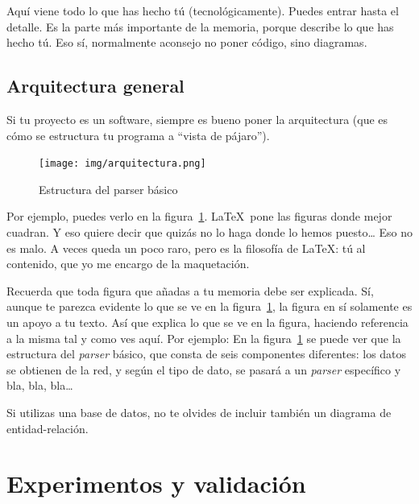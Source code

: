 \documentclass[a4paper, 12pt]{book}
\begin{document}
	Aquí viene todo lo que has hecho tú (tecnológicamente). 
	Puedes entrar hasta el detalle. 
	Es la parte más importante de la memoria, porque describe lo que has hecho tú.
	Eso sí, normalmente aconsejo no poner código, sino diagramas.
	
	
	
	\section{Arquitectura general} 
	\label{sec:arquitectura}
	
	Si tu proyecto es un software, siempre es bueno poner la arquitectura (que es cómo se estructura tu programa a ``vista de pájaro'').
	
	\begin{figure}
		\centering
		\texttt{[image: img/arquitectura.png]}
		\caption{Estructura del parser básico}
		\label{fig:arquitectura}
	\end{figure}
	
	
	Por ejemplo, puedes verlo en la figura~\ref{fig:arquitectura}.
	\LaTeX \ pone las figuras donde mejor cuadran. 
	Y eso quiere decir que quizás no lo haga donde lo hemos puesto\ldots 
	Eso no es malo.
	A veces queda un poco raro, pero es la filosofía de \LaTeX: tú al contenido, que yo me encargo de la maquetación.
	
	
	
	Recuerda que toda figura que añadas a tu memoria debe ser explicada.
	Sí, aunque te parezca evidente lo que se ve en la figura~\ref{fig:arquitectura}, la figura en sí solamente es un apoyo a tu texto.
	Así que explica lo que se ve en la figura, haciendo referencia a la misma tal y como ves aquí.
	Por ejemplo: En la figura~\ref{fig:arquitectura} se puede ver que la estructura del \emph{parser} básico, que consta de seis componentes diferentes: los datos se obtienen de la red, y según el tipo de dato, se pasará a un \emph{parser} específico y bla, bla, bla\ldots
	
	Si utilizas una base de datos, no te olvides de incluir también un diagrama de entidad-relación.
	
	
	
	\cleardoublepage
	\chapter{Experimentos y validación}
	\label{chap:experimentos}
	
\end{document}
